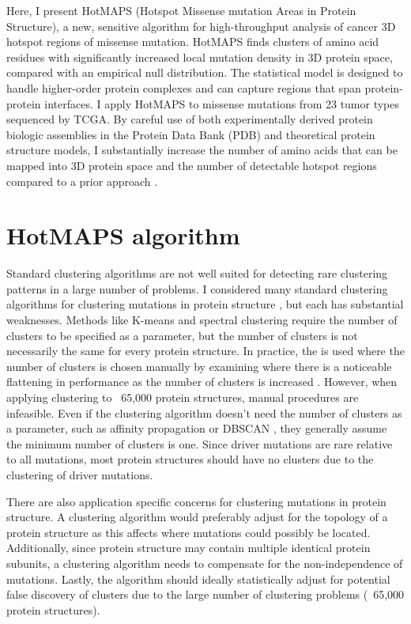 Here, I present HotMAPS (Hotspot Missense mutation Areas in Protein Structure), a new, sensitive algorithm for high-throughput analysis of cancer 3D hotspot regions of missense mutation. HotMAPS finds clusters of amino acid residues with significantly increased local mutation density in 3D protein space, compared with an empirical null distribution. The statistical model is designed to handle higher-order protein complexes and can capture regions that span protein-protein interfaces. I apply HotMAPS to missense mutations from 23 tumor types sequenced by TCGA. By careful use of both experimentally derived protein biologic assemblies in the Protein Data Bank (PDB) and theoretical protein structure models, I substantially increase the number of amino acids that can be mapped into 3D protein space and the number of detectable hotspot regions compared to a prior approach \cite{RN105}.

\section{HotMAPS algorithm}

Standard clustering algorithms are not well suited for detecting rare clustering patterns in a large number of problems. I considered many standard clustering algorithms for clustering mutations in protein structure \cite{RN117, RN114, RN115, RN116}, but each has substantial weaknesses. Methods like K-means and spectral clustering require the number of clusters to be specified as a parameter, but the number of clusters is not necessarily the same for every protein structure. In practice, the  is used where the number of clusters is chosen manually by examining where there is a noticeable flattening in performance as the number of clusters is increased \cite{RN118}. However, when applying clustering to ~65,000 protein structures, manual procedures are infeasible. Even if the clustering algorithm doesn't need the number of clusters as a parameter, such as affinity propagation \cite{RN114} or DBSCAN \cite{RN117}, they generally assume the minimum number of clusters is one. Since driver mutations are rare relative to all mutations, most protein structures should have no clusters due to the clustering of driver mutations.

There are also application specific concerns for clustering mutations in protein structure. A clustering algorithm would preferably adjust for the topology of a protein structure as this affects where mutations could possibly be located. Additionally, since protein structure may contain multiple identical protein subunits, a clustering algorithm needs to compensate for the non-independence of mutations. Lastly, the algorithm should ideally statistically adjust for potential false discovery of clusters due to the large number of clustering problems (~65,000 protein structures). 

